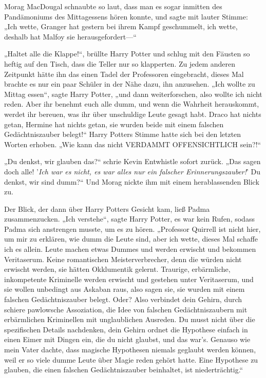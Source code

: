 {Morag MacDougal schnaubte so laut, dass man es sogar inmitten des Pandämoniums des Mittagessens hören konnte, und sagte mit lauter Stimme: „Ich wette, Granger hat gestern bei ihrem Kampf geschummelt, ich wette, deshalb hat Malfoy sie herausgefordert—“

„Haltet alle die Klappe!“, brüllte Harry Potter und schlug mit den Fäusten so heftig auf den Tisch, dass die Teller nur so klapperten. Zu jedem anderen Zeitpunkt hätte ihn das einen Tadel der Professoren eingebracht, dieses Mal brachte es nur ein paar Schüler in der Nähe dazu, ihn anzusehen. „Ich wollte zu Mittag essen“, sagte Harry Potter, „und dann weiterforschen, also wollte ich nicht reden. Aber ihr benehmt euch alle dumm, und wenn die Wahrheit herauskommt, werdet ihr bereuen, was ihr über unschuldige Leute gesagt habt. Draco hat nichts getan, Hermine hat nichts getan, sie wurden beide mit einem falschen Gedächtniszauber belegt!“ Harry Potters Stimme hatte sich bei den letzten Worten erhoben. „Wie kann das nicht VERDAMMT OFFENSICHTLICH sein?!“

„Du denkst, wir glauben das?“ schrie Kevin Entwhistle sofort zurück. „Das sagen doch alle! '\emph{Ich war es nicht, es war alles nur ein falscher Erinnerungszauber!}' Du denkst, wir sind dumm?“ Und Morag nickte ihm mit einem herablassenden Blick zu.

Der Blick, der dann über Harry Potters Gesicht kam, ließ Padma zusammenzucken. „Ich verstehe“, sagte Harry Potter, es war kein Rufen, sodass Padma sich anstrengen musste, um es zu hören. „Professor Quirrell ist nicht hier, um mir zu erklären, wie dumm die Leute sind, aber ich wette, dieses Mal schaffe ich es allein. Leute machen etwas Dummes und werden erwischt und bekommen Veritaserum. Keine romantischen Meisterverbrecher, denn die würden nicht erwischt werden, sie hätten Okklumentik gelernt. Traurige, erbärmliche, inkompetente Kriminelle werden erwischt und gestehen unter Veritaserum, und sie wollen unbedingt aus Askaban raus, also sagen sie, sie wurden mit einem falschen Gedächtniszauber belegt. Oder? Also verbindet dein Gehirn, durch schiere pawlowsche Assoziation, die Idee von falschen Gedächtniszaubern mit erbärmlichen Kriminellen mit unglaublichen Ausreden. Du musst nicht über die spezifischen Details nachdenken, dein Gehirn ordnet die Hypothese einfach in einen Eimer mit Dingen ein, die du nicht glaubst, und das war's. Genauso wie mein Vater dachte, dass magische Hypothesen niemals geglaubt werden können, weil er so viele dumme Leute über Magie reden gehört hatte. Eine Hypothese zu glauben, die einen falschen Gedächtniszauber beinhaltet, ist niederträchtig.“

}
